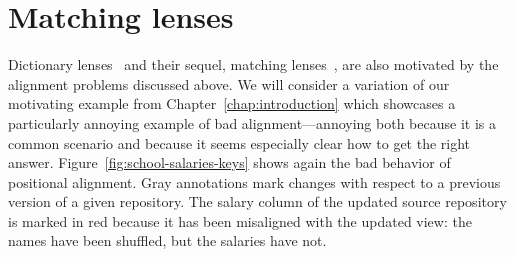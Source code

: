 \section{Matching lenses}
\label{sec:matching}
Dictionary lenses~\cite{Boomerang07} and their sequel, matching
lenses~\cite{Matching10}, are also motivated by the alignment problems
discussed above. We will consider a variation of our motivating example from
Chapter~\ref{chap:introduction} which showcases a particularly annoying
example of bad alignment---annoying both because it is a common scenario and
because it seems especially clear how to get the right answer.
Figure~\ref{fig:school-salaries-keys} shows again the bad behavior of
positional alignment. Gray annotations mark changes with respect to a
previous version of a given repository. The salary column of the updated
source repository is marked in red because it has been misaligned with the
updated view: the names have been shuffled, but the salaries have not.

